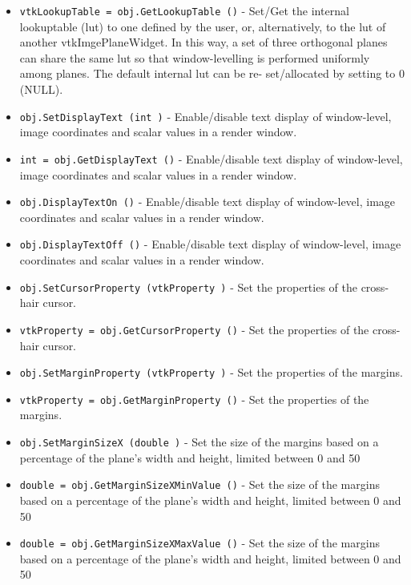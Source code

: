\begin{itemize}
\item  \verb|vtkLookupTable = obj.GetLookupTable ()| -  Set/Get the internal lookuptable (lut) to one defined by the user, or,
 alternatively, to the lut of another vtkImgePlaneWidget.  In this way,
 a set of three orthogonal planes can share the same lut so that
 window-levelling is performed uniformly among planes.  The default
 internal lut can be re- set/allocated by setting to 0 (NULL).

\item  \verb|obj.SetDisplayText (int )| -  Enable/disable text display of window-level, image coordinates and
 scalar values in a render window.

\item  \verb|int = obj.GetDisplayText ()| -  Enable/disable text display of window-level, image coordinates and
 scalar values in a render window.

\item  \verb|obj.DisplayTextOn ()| -  Enable/disable text display of window-level, image coordinates and
 scalar values in a render window.

\item  \verb|obj.DisplayTextOff ()| -  Enable/disable text display of window-level, image coordinates and
 scalar values in a render window.

\item  \verb|obj.SetCursorProperty (vtkProperty )| -  Set the properties of the cross-hair cursor.

\item  \verb|vtkProperty = obj.GetCursorProperty ()| -  Set the properties of the cross-hair cursor.

\item  \verb|obj.SetMarginProperty (vtkProperty )| -  Set the properties of the margins.

\item  \verb|vtkProperty = obj.GetMarginProperty ()| -  Set the properties of the margins.

\item  \verb|obj.SetMarginSizeX (double )| -  Set the size of the margins based on a percentage of the
 plane's width and height, limited between 0 and 50%

\item  \verb|double = obj.GetMarginSizeXMinValue ()| -  Set the size of the margins based on a percentage of the
 plane's width and height, limited between 0 and 50%

\item  \verb|double = obj.GetMarginSizeXMaxValue ()| -  Set the size of the margins based on a percentage of the
 plane's width and height, limited between 0 and 50%


\end{itemize}
